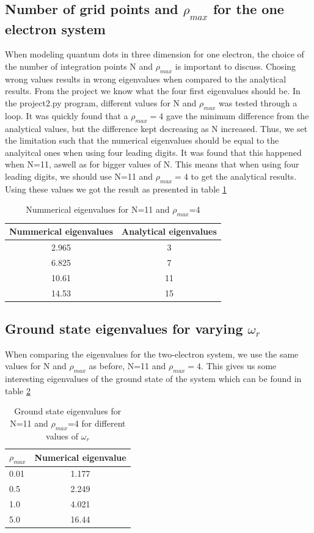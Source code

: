 \documentclass{article}
\begin{document}
\subsection{Number of grid points and $\rho_{max}$ for the one electron system}

When modeling quantum dots in three dimension for one electron, the choice of the number of integration points N and $\rho_{max}$ is important to discuss. Chosing wrong values results in wrong eigenvalues when compared to the analytical results. From the project we know what the four first eigenvalues should be. In the project2.py program, different values for N and $\rho_{max}$ was tested through a loop.
It was quickly found that a $\rho_{max}=4$ gave the minimum difference from the analytical values, but the difference kept decreasing as N increased. Thus, we set the limitation such that the numerical eigenvalues should be equal to the analyitcal ones when using four leading digits. It was found that this happened when N=11, aswell as for bigger values of N. This means that when using four leading digits, we should use N=11 and $\rho_{max}=4$ to get the analytical results. Using these values we got the result as presented in table \ref{tabelur1}

\begin{table}[H]
    \centering
    \begin{tabular}{|c|c|}
    \hline
     Nummerical eigenvalues & Analytical eigenvalues\\
     \hline
      2.965  &  3\\
      6.825  &  7\\
      10.61  &  11\\
      14.53  &  15\\
     \hline
    \end{tabular}
    \caption{Nummerical eigenvalues for N=11 and $\rho_{max}$=4}
    \label{tabelur1}
\end{table}

\subsection{Ground state eigenvalues for varying $\omega_r$}

When comparing the eigenvalues for the two-electron system, we use the same values for N and $\rho_{max}$ as before, N=11 and $\rho_{max}=4$. This gives us some interesting eigenvalues of the ground state of the system which can be found in table \ref{tabelur2}

\begin{table}[H]
    \centering
    \begin{tabular}{|l|c|}
    \hline
    $\rho_{max}$ & Numerical eigenvalue \\
    \hline
    0.01 & 1.177  \\
    0.5  & 2.249  \\
    1.0 & 4.021  \\
    5.0 &  16.44  \\
     \hline
    \end{tabular}
    \caption{Ground state eigenvalues for N=11 and $\rho_{max}$=4 for different values of $\omega_r$}
    \label{tabelur2}
\end{table}
\end{document}
